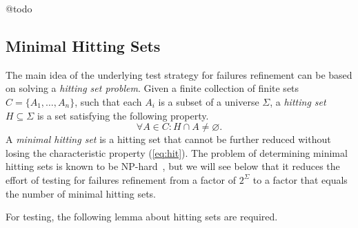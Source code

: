 @todo

\subsection{Minimal Hitting Sets}
\label{sec:hit}

The main idea of the underlying test strategy for failures refinement can be
based on solving a \emph{hitting set problem}. Given a finite collection of
finite sets $C = \{ A_1,\dots,A_n\}$, such that each $A_i$ is a subset of a
universe $\Sigma$, a \emph{hitting set} $H\subseteq\Sigma$ is a set
satisfying the following property.
%
\begin{equation}
  \label{eq:hit}
  \forall A\in C: H\cap A \neq\varnothing.
\end{equation}
%
A \emph{minimal hitting set} is a hitting set that cannot be further reduced
without losing the characteristic property (\ref{eq:hit}). The problem of
determining minimal hitting sets is known to be
NP-hard~\cite{Book1975-BOOKRM}, but we will see below that it reduces the
effort of testing for failures refinement from a factor of $2^\Sigma$ to a
factor that equals the number of minimal hitting sets.

For testing, the following lemma about hitting sets are required.

